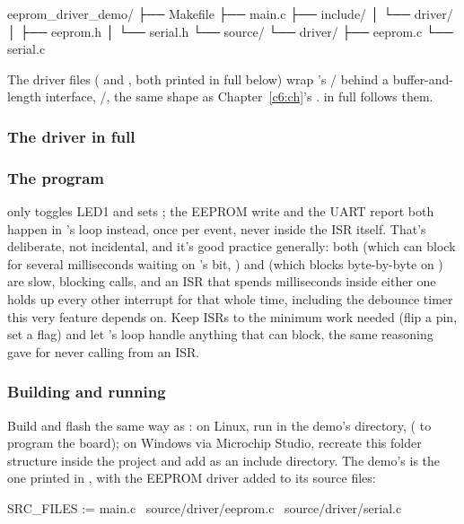 \begin{console}
eeprom_driver_demo/
├── Makefile
├── main.c
├── include/
│   └── driver/
│       ├── eeprom.h
│       └── serial.h
└── source/
    └── driver/
        ├── eeprom.c
        └── serial.c
\end{console}

\noindent The driver files ( and , both printed in full
below) wrap 's / behind a
buffer-and-length interface, /, the same shape as
Chapter~\ref{c6:ch}'s .  in full follows them.

\subsubsection{The driver in full}

\subsubsection{The program}

\noindent{} only toggles LED1 and sets ; the EEPROM write and
the UART report both happen in 's loop instead, once per event, never inside the ISR
itself. That's deliberate, not incidental, and it's good practice generally: both
 (which can block for several milliseconds waiting on 's
 bit, ) and  (which blocks byte-by-byte on
) are slow, blocking calls, and an ISR that spends milliseconds inside either one holds
up every other interrupt for that whole time, including the debounce timer this very feature
depends on. Keep ISRs to the minimum work needed (flip a pin, set a flag) and let 's
loop handle anything that can block, the same reasoning  gave for never calling
 from an ISR.

\subsubsection{Building and running}
Build and flash the same way as : on Linux, run  in the demo's
directory,  ( to program the board); on
Windows via Microchip Studio, recreate this folder structure inside the project and add
 as an include directory. The demo's  is the one printed in
, with the EEPROM driver added to its source files:

\begin{makecode}
SRC_FILES := main.c \
             source/driver/eeprom.c \
             source/driver/serial.c \
\end{makecode}
